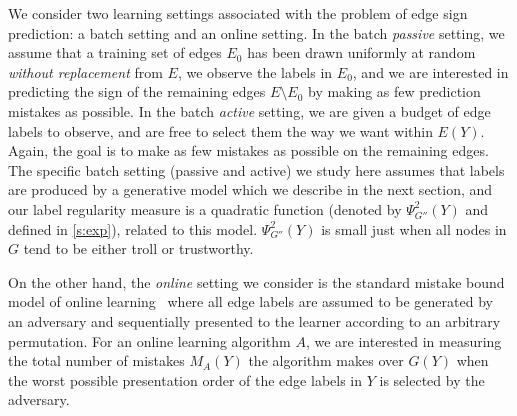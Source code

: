 We consider two learning settings associated with the problem of edge sign prediction: a batch
setting and an online setting. In the batch \emph{passive} setting, we assume that a training set
of edges $E_0$ has been drawn uniformly at random \emph{without replacement} from $E$, we observe
the labels in $E_0$, and we are interested in predicting the sign of the remaining edges $E
\setminus E_0$ by making as few prediction mistakes as possible. In the batch \emph{active}
setting, we are given a budget of edge labels to observe, and are free to select them the way we
want within $E(Y)$. Again, the goal is to make as few mistakes as possible on the remaining edges.
The specific batch setting (passive and active) we study here assumes that labels are produced by a
generative model which we describe in the next section, and our label regularity measure is a
quadratic function (denoted by $\Psi^2_{G''}(Y)$ and defined in \autoref{s:exp}), related to this
model. $\Psi^2_{G''}(Y)$ is small just when all nodes in $G$ tend to be either troll or
trustworthy. 

On the other hand, the \emph{online} setting we consider is the standard mistake bound model of
online learning~\autocite{Winnow88} where all edge labels are assumed to be generated by an
adversary and sequentially presented to the learner according to an arbitrary permutation. For an
online learning algorithm $A$, we are interested in measuring the total number of mistakes $M_A(Y)$
the algorithm makes over $G(Y)$ when the worst possible presentation order of the edge labels in
$Y$ is selected by the adversary.

